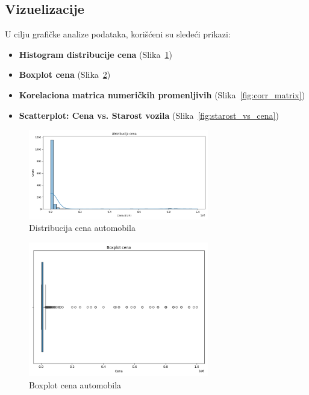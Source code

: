 \documentclass[a4paper,12pt]{article}
\begin{document}
\subsection{Vizuelizacije}

U cilju grafičke analize podataka, korišćeni su sledeći prikazi:

\begin{itemize}
    \item \textbf{Histogram distribucije cena} (Slika~\ref{fig:hist_cena})
    \item \textbf{Boxplot cena} (Slika~\ref{fig:box_cena})
    \item \textbf{Korelaciona matrica numeričkih promenljivih} (Slika~\ref{fig:corr_matrix})
    \item \textbf{Scatterplot: Cena vs. Starost vozila} (Slika~\ref{fig:starost_vs_cena})
\end{itemize}

\begin{figure}[H]
    \centering
    \includegraphics[width=0.7\textwidth]{hist_cena.png}
    \caption{Distribucija cena automobila}
    \label{fig:hist_cena}
\end{figure}

\begin{figure}[H]
    \centering
    \includegraphics[width=0.7\textwidth]{box_cena.png}
    \caption{Boxplot cena automobila}
    \label{fig:box_cena}
\end{figure}
\end{document}
